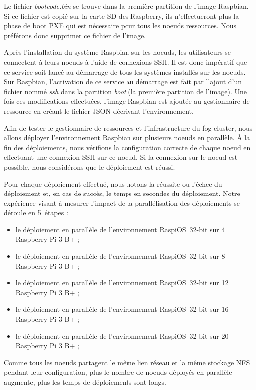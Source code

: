 \documentclass[letterpaper, 10 pt, conference]{ieeeconf}
\begin{document}
Le fichier \textit{bootcode.bin} se trouve dans la première partition de l'image Raspbian. Si ce fichier est copié sur la carte SD des Raspberry, ils n'effectueront plus la phase de boot PXE qui est nécessaire pour tous les noeuds ressources. Nous préférons donc supprimer ce fichier de l'image.

Après l'installation du système Raspbian sur les noeuds, les utilisateurs se connectent à leurs noeuds à l'aide de connexions SSH. Il est donc impératif que ce service soit lancé au démarrage de tous les systèmes installés sur les noeuds. Sur Raspbian, l'activation de ce service au démarrage est fait par l'ajout d'un fichier nommé \textit{ssh} dans la partition \textit{boot} (la première partition de l'image). Une fois ces  modifications effectuées, l'image Raspbian est ajoutée au gestionnaire de ressource en créant le fichier JSON décrivant l'environnement.

Afin de tester le gestionnaire de ressources et l'infrastructure du fog cluster, nous allons déployer l'environnement Raspbian sur plusieurs noeuds en parallèle. À la fin des déploiements, nous vérifions la configuration correcte de chaque noeud en effectuant une connexion SSH sur ce noeud. Si la connexion sur le noeud est possible, nous considérons que le déploiement est réussi.

Pour chaque déploiement effectué, nous notons la réussite ou l'échec du déploiement et, en cas de succès, le temps en secondes du déploiement. Notre expérience visant à mesurer l'impact de la parallélisation des déploiements se déroule en 5~étapes :
\begin{itemize}
    \item le déploiement en parallèle de l'environnement RaspiOS~32-bit sur 4 Raspberry Pi 3 B+ ;
    \item le déploiement en parallèle de l'environnement RaspiOS~32-bit sur 8 Raspberry Pi 3 B+ ;
    \item le déploiement en parallèle de l'environnement RaspiOS~32-bit sur 12 Raspberry Pi 3 B+ ;
    \item le déploiement en parallèle de l'environnement RaspiOS~32-bit sur 16 Raspberry Pi 3 B+ ;
    \item le déploiement en parallèle de l'environnement RaspiOS~32-bit sur 20 Raspberry Pi 3 B+ ;
\end{itemize}
Comme tous les noeuds partagent le même lien réseau et la même stockage NFS pendant leur configuration, plus le nombre de noeuds déployés en parallèle augmente, plus les temps de déploiements sont longs.
\end{document}
